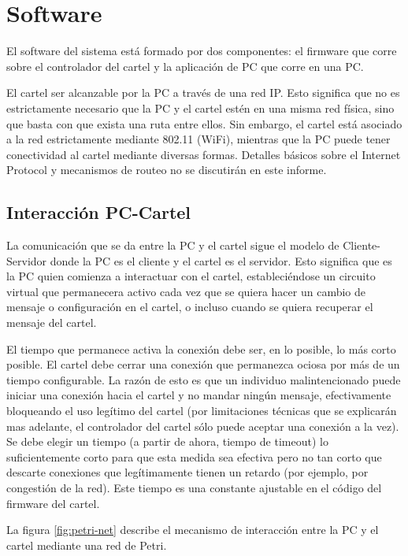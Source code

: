 \section{Software}\label{sec:sw}
El software del sistema está formado por dos componentes: el firmware que corre sobre el controlador del cartel y la aplicación de PC que corre en una PC.

El cartel ser alcanzable por la PC a través de una red IP. Esto significa que no es estrictamente necesario que la PC y el cartel estén en una misma red física, sino que basta con que exista una ruta entre ellos. Sin embargo, el cartel está asociado a la red estrictamente mediante 802.11 (WiFi), mientras que la PC puede tener conectividad al cartel mediante diversas formas. Detalles básicos sobre el Internet Protocol y mecanismos de routeo no se discutirán en este informe.

\subsection{Interacción PC-Cartel}
La comunicación que se da entre la PC y el cartel sigue el modelo de Cliente-Servidor donde la PC es el cliente y el cartel es el servidor. Esto significa que es la PC quien comienza a interactuar con el cartel, estableciéndose un circuito virtual que permanecera activo cada vez que se quiera hacer un cambio de mensaje o configuración en el cartel, o incluso cuando se quiera recuperar el mensaje del cartel.

El tiempo que permanece activa la conexión debe ser, en lo posible, lo más corto posible. El cartel debe cerrar una conexión que permanezca ociosa por más de un tiempo configurable. La razón de esto es que un individuo malintencionado puede iniciar una conexión hacia el cartel y no mandar ningún mensaje, efectivamente bloqueando el uso legítimo del cartel (por limitaciones técnicas que se explicarán mas adelante, el controlador del cartel sólo puede aceptar una conexión a la vez). Se debe elegir un tiempo (a partir de ahora, tiempo de timeout) lo suficientemente corto para que esta medida sea efectiva pero no tan corto que descarte conexiones que legítimamente tienen un retardo (por ejemplo, por congestión de la red). Este tiempo es una constante ajustable en el código del firmware del cartel.

La figura \ref{fig:petri-net} describe el mecanismo de interacción entre la PC y el cartel mediante una red de Petri.


